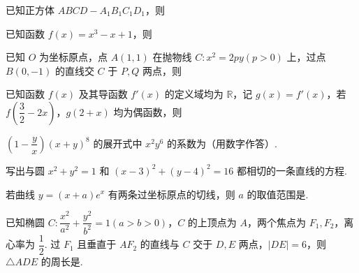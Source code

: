 \documentclass[a4paper,11pt]{report}
\begin{document}
\begin{examquestions}[start=9]
\item 已知正方体 $ABCD-A_1B_1C_1D_1$，则
\item 已知函数 $f(x)=x^3-x+1$，则
\item 已知 $O$ 为坐标原点，点 $A(1,1)$ 在抛物线 $C:x^2=2py(p>0)$ 上，过点 $B(0,-1)$ 的直线交 $C$ 于 $P,Q$ 两点，则
\item 已知函数 $f(x)$ 及其导函数 $f'(x)$ 的定义域均为 $\mathbb R$，记 $g(x)=f'(x)$，若 $f\left(\dfrac32-2x\right)$，$g(2+x)$ 均为偶函数，则
\end{examquestions}
\begin{examquestions}[start=13]
\item $\left(1-\dfrac yx\right)(x+y)^8$ 的展开式中 $x^2y^6$ 的系数为\blank（用数字作答）. 
\item 写出与圆 $x^2+y^2=1$ 和 $(x-3)^2+(y-4)^2=16$ 都相切的一条直线的方程\blank. 
\item 若曲线 $y=(x+a)e^x$ 有两条过坐标原点的切线，则 $a$ 的取值范围是\blank. 
\item 已知椭圆 $C:\dfrac{x^2}{a^2}+\dfrac{y^2}{b^2}=1(a>b>0)$，$C$ 的上顶点为 $A$，两个焦点为 $F_1,F_2$，离心率为 $\dfrac12$. 过 $F_1$ 且垂直于 $AF_2$ 的直线与 $C$ 交于 $D,E$ 两点，$|DE|=6$，则 $\triangle ADE$ 的周长是\blank. 
\end{examquestions}
\end{document}
